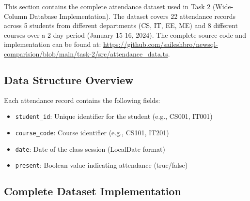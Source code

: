 This section contains the complete attendance dataset used in Task 2 (Wide-Column Database Implementation). The dataset covers 22 attendance records across 5 students from different departments (CS, IT, EE, ME) and 8 different courses over a 2-day period (January 15-16, 2024). The complete source code and implementation can be found at: \url{https://github.com/saileshbro/newsql-comparision/blob/main/task-2/src/attendance_data.ts}.

\subsection{Data Structure Overview}

Each attendance record contains the following fields:
\begin{itemize}
    \item \texttt{student\_id}: Unique identifier for the student (e.g., CS001, IT001)
    \item \texttt{course\_code}: Course identifier (e.g., CS101, IT201)
    \item \texttt{date}: Date of the class session (LocalDate format)
    \item \texttt{present}: Boolean value indicating attendance (true/false)
\end{itemize}

\subsection{Complete Dataset Implementation}

